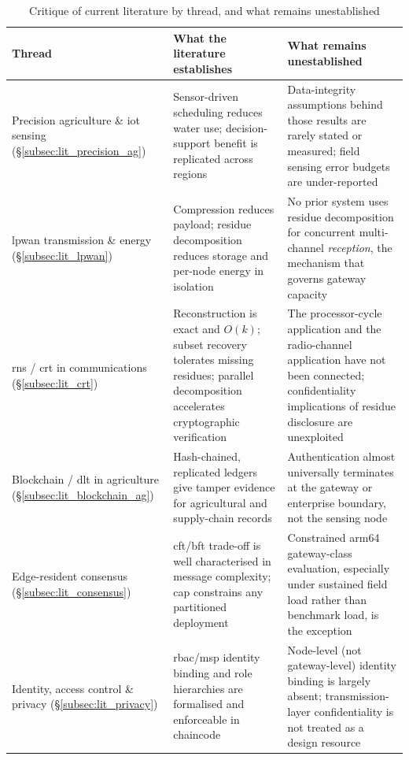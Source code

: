 \documentclass[12pt,a4paper,oneside]{book}
\begin{document}
\begin{table}[htbp]
\centering
\caption{Critique of current literature by thread, and what remains
         unestablished}
\label{tab:lit-gap-summary}
\footnotesize
\begin{tabularx}{\textwidth}{@{}p{}X X@{}}
\toprule
\textbf{Thread} & \textbf{What the literature establishes} & \textbf{What remains unestablished} \\
\midrule
Precision agriculture \& \gls{iot} sensing (\S\ref{subsec:lit_precision_ag})
  & Sensor-driven scheduling reduces water use; decision-support benefit is
    replicated across regions
  & Data-integrity assumptions behind those results are rarely stated or
    measured; field sensing error budgets are under-reported \\
\midrule
\gls{lpwan} transmission \& energy (\S\ref{subsec:lit_lpwan})
  & Compression reduces payload; residue decomposition reduces storage and
    per-node energy in isolation
  & No prior system uses residue decomposition for concurrent multi-channel
    \emph{reception}, the mechanism that governs gateway capacity \\
\midrule
\gls{rns} / \gls{crt} in communications (\S\ref{subsec:lit_crt})
  & Reconstruction is exact and $O(k)$; subset recovery tolerates missing
    residues; parallel decomposition accelerates cryptographic verification
  & The processor-cycle application and the radio-channel application have
    not been connected; confidentiality implications of residue disclosure
    are unexploited \\
\midrule
Blockchain / \gls{dlt} in agriculture (\S\ref{subsec:lit_blockchain_ag})
  & Hash-chained, replicated ledgers give tamper evidence for agricultural
    and supply-chain records
  & Authentication almost universally terminates at the gateway or
    enterprise boundary, not the sensing node \\
\midrule
Edge-resident consensus (\S\ref{subsec:lit_consensus})
  & \gls{cft}/\gls{bft} trade-off is well characterised in message
    complexity; \gls{cap} constrains any partitioned deployment
  & Constrained \gls{arm64} gateway-class evaluation, especially under
    sustained field load rather than benchmark load, is the exception \\
\midrule
Identity, access control \& privacy (\S\ref{subsec:lit_privacy})
  & \gls{rbac}/\gls{msp} identity binding and role hierarchies are
    formalised and enforceable in chaincode
  & Node-level (not gateway-level) identity binding is largely absent;
    transmission-layer confidentiality is not treated as a design resource \\
\bottomrule
\end{tabularx}
\end{table}
\end{document}

